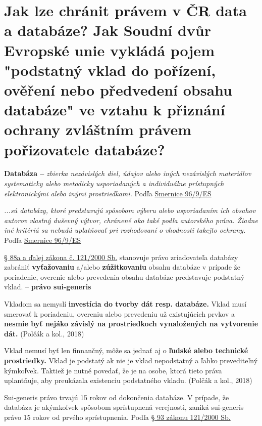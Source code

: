 \section{Jak lze chránit právem v ČR data a databáze? Jak Soudní dvůr Evropské unie vykládá pojem "podstatný vklad do pořízení, ověření nebo předvedení obsahu databáze" ve vztahu k přiznání ochrany zvláštním právem pořizovatele databáze?}

\textbf{Databáza \--- }\textit{zbierka nezávislých diel, údajov alebo iných nezávislých materiálov systematicky alebo metodicky usporiadaných a individuálne prístupných elektronickými alebo inými prostriedkami.} Podľa \href{https://eur-lex.europa.eu/legal-content/SK/ALL/?uri=celex:31996L0009}{Smernice 96/9/ES}

\textit{...sú databázy, ktoré predstavujú spôsobom výberu alebo usporiadaním ich obsahov
autorov vlastný duševný výtvor, chránené ako také podľa
autorského práva. Žiadne iné kritériá sa nebudú uplatňovať
pri rozhodovaní o vhodnosti takejto ochrany.} Podľa \href{https://eur-lex.europa.eu/legal-content/SK/ALL/?uri=celex:31996L0009}{Smernice 96/9/ES}

\href{https://www.zakonyprolidi.cz/cs/2000-121#:~:text=zvlastni%20prava%20k%20databazi%20(%C2%A7%2090)%20prislusi%20porizovateli%20databaze%2C%20pokud%20porizeni%2C%20overeni%20nebo%20predvedeni%20obsahu%20databaze%20predstavuje%20kvalitativne%20nebo%20kvantitativne%20podstatny%20vklad%20bez%20ohledu%20na%20to%2C%20zda%20databaze%20nebo%20jeji%20obsah%20jsou%20predmetem%20autorskopravni%20nebo%20jine%20ochrany.}{§ 88a a ďalej zákona č. 121/2000 Sb.} stanovuje právo zriaďovateľa databázy zabrániť \textbf{vyťažovaniu} a/alebo \textbf{zúžitkovaniu} obsahu databáze v prípade že poriadenie, overenie alebo prevedenia obsahu databáze predstavuje podstatný vklad. \--- \textbf{právo sui-generis}

Vkladom sa nemyslí \textbf{investícia do tvorby dát resp. databáze.} Vklad musí smerovať k poriadeniu, overeniu alebo prevedeniu už existujúcich prvkov a \textbf{nesmie byť nejáko závislý na prostriedkoch vynaložených na vytvorenie dát.} (Polčák a kol., 2018)

Vklad nemusí byť len finnančný, môže sa jednať aj o \textbf{ľudské alebo technické prostriedky.} Vklad je podstatý ak nie je vklad nepodstatný a ľahko prevediteľný kýmkoľvek. Taktiež je nutné povedať, že je na osobe, ktorá tieto práva uplantňuje, aby preukázala existenciu podstatného vkladu. (Polčák a kol., 2018)

Sui-generis právo trvajú 15 rokov od dokončenia databáze. V prípade, že databáza je akýmkoľvek spôsobom sprístupnená verejnosti, zaniká sui-generis právo 15 rokov od prvého sprístupnenia. Podľa \href{https://www.zakonyprolidi.cz/cs/2000-121#:~:text=pr%C3%A1vo%20po%C5%99izovatele%20datab%C3%A1ze-,trva%2015%20let%20,-od%20po%C5%99%C3%ADzen%C3%AD%20datab%C3%A1ze}{§ 93 zákonu 121/2000 Sb.}

